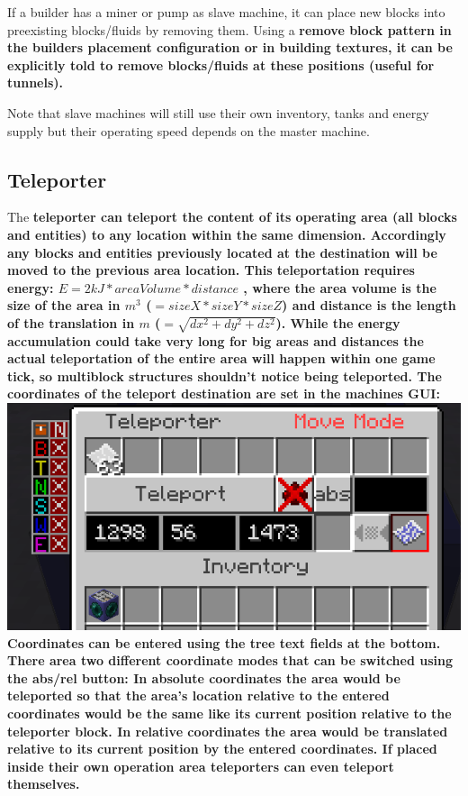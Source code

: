 \documentclass[11pt]{article} %
\begin{document}
If a builder has a miner or pump as slave machine, it can place new blocks into preexisting blocks/fluids by removing them. Using a \bf remove block pattern \rm in the builders placement configuration or in building textures, it can be explicitly told to remove blocks/fluids at these positions (useful for tunnels).

Note that slave machines will still use their own inventory, tanks and energy supply but their operating speed depends on the master machine.

\subsection{Teleporter}
The \bf teleporter \rm can teleport the content of its operating area (all blocks and entities) to any location within the same dimension. Accordingly any blocks and entities previously located at the destination will be moved to the previous area location. This teleportation requires energy: $E = 2kJ * areaVolume * distance$ , where the area volume is the size of the area in $m^3$ (${=sizeX * sizeY * sizeZ}$) and distance is the length of the translation in $m$ (${=\sqrt{dx^2 + dy^2 + dz^2}}$). While the energy accumulation could take very long for big areas and distances the actual teleportation of the entire area will happen within one game tick, so multiblock structures shouldn't notice being teleported. The coordinates of the teleport destination are set in the machines GUI: \\
\includegraphics[width = \textwidth]{teleporter} \\
Coordinates can be entered using the tree text fields at the bottom. There area two different coordinate modes that can be switched using the abs/rel button: In absolute coordinates the area would be teleported so that the area's location relative to the entered coordinates would be the same like its current position relative to the teleporter block. In relative coordinates the area would be translated relative to its current position by the entered coordinates.  If placed inside their own operation area teleporters can even teleport themselves.
\end{document}
